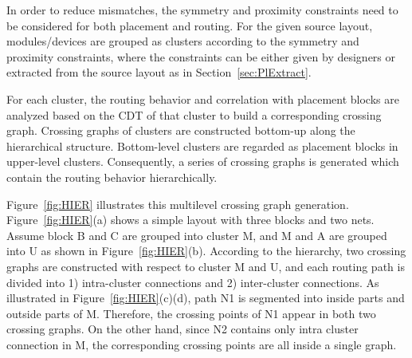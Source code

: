     In order to reduce mismatches, the symmetry and proximity constraints need to be considered for both placement and routing. 
    For the given source layout, modules/devices are grouped as clusters according to the symmetry and proximity constraints, 
    where the constraints can be either given by designers or extracted from the source layout as in Section~\ref{sec:PlExtract}.

    For each cluster, the routing behavior and correlation with placement blocks are analyzed based on the CDT of that cluster to build a corresponding crossing graph. 
    Crossing graphs of clusters are constructed bottom-up along the hierarchical structure. 
    Bottom-level clusters are regarded as placement blocks in upper-level clusters. 
    Consequently, a series of crossing graphs is generated which contain the routing behavior hierarchically.

    Figure~\ref{fig:HIER} illustrates this multilevel crossing graph generation.
    Figure~\ref{fig:HIER}(a) shows a simple layout with three blocks and two nets.
    Assume block B and C are grouped into cluster M, and M and A are grouped into U as shown in Figure~\ref{fig:HIER}(b).
    According to the hierarchy, two crossing graphs are constructed with respect to cluster M and U, and
    each routing path is divided into 1) intra-cluster connections and 2) inter-cluster connections. 
    As illustrated in Figure~\ref{fig:HIER}(c)(d), path N1 is segmented into inside parts and outside parts of M. 
    Therefore, the crossing points of N1 appear in both two crossing graphs. 
    On the other hand, since N2 contains only intra cluster connection in M, the corresponding crossing points are all inside a single graph. 

    


